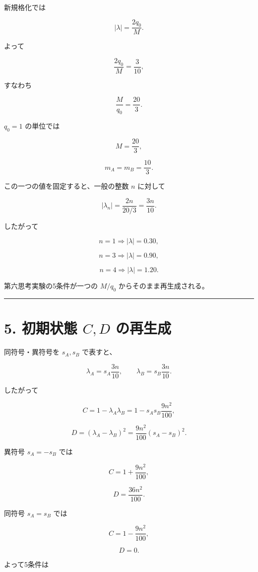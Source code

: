 \documentclass[
  a4paper,
]{ltjsarticle}
\begin{document}
新規格化では

\[
|\lambda|
=
\frac{2q_0}{M}.
\]

よって

\[
\frac{2q_0}{M}=\frac{3}{10},
\]

すなわち

\[
\boxed{\frac{M}{q_0}=\frac{20}{3}}.
\]

\(q_0=1\) の単位では

\[
\boxed{M=\frac{20}{3}},
\]

\[
\boxed{m_A=m_B=\frac{10}{3}}.
\]

この一つの値を固定すると、一般の整数 \(n\) に対して

\[
|\lambda_n|
=
\frac{2n}{20/3}
=
\frac{3n}{10}.
\]

したがって

\[
n=1\Rightarrow |\lambda|=0.30,
\]

\[
n=3\Rightarrow |\lambda|=0.90,
\]

\[
n=4\Rightarrow |\lambda|=1.20.
\]

第六思考実験の5条件が一つの \(M/q_0\) からそのまま再生成される。

\begin{center}\rule{0.5\linewidth}{0.5pt}\end{center}

\section{\texorpdfstring{5. 初期状態 \(C,D\)
の再生成}{5. 初期状態 C,D の再生成}}\label{ux521dux671fux72b6ux614b-cd-ux306eux518dux751fux6210}

同符号・異符号を \(s_A,s_B\) で表すと、

\[
\lambda_A=s_A\frac{3n}{10},
\qquad
\lambda_B=s_B\frac{3n}{10}.
\]

したがって

\[
C
=
1-\lambda_A\lambda_B
=
1-s_As_B\frac{9n^2}{100},
\]

\[
D
=
(\lambda_A-\lambda_B)^2
=
\frac{9n^2}{100}(s_A-s_B)^2.
\]

異符号 \(s_A=-s_B\) では

\[
C=1+\frac{9n^2}{100},
\]

\[
D=\frac{36n^2}{100}.
\]

同符号 \(s_A=s_B\) では

\[
C=1-\frac{9n^2}{100},
\]

\[
D=0.
\]

よって5条件は
\end{document}
